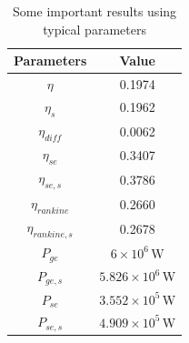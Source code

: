 \documentclass{article}
\begin{document}
\begin{table}[htbp]
	\caption{Some important results using typical parameters}
	\begin{center}
	\begin{tabular}{cc}
		\toprule
		Parameters	&	Value\\
		\midrule
		$\eta$		&	0.1974\\
		$\eta_s$	&	0.1962\\
		$\eta_{diff}$		&	0.0062\\
		$\eta_{se}$	&	0.3407\\
		$\eta_{se,s}$	&	0.3786\\
		$\eta_{rankine}$	&	0.2660\\
		$\eta_{rankine,s}$	&	0.2678\\
		$P_{ge}$		&	$6\times10^6\,$W\\
		$P_{ge,s}$	&	$5.826\times10^6\,$W\\
		$P_{se}$		&	$3.552\times10^5\,$W\\
		$P_{se,s}$	&	$4.909\times10^5\,$W\\
		\bottomrule
	\end{tabular}
	\end{center}
	\label{tab:importantResults}
\end{table}
\end{document}
